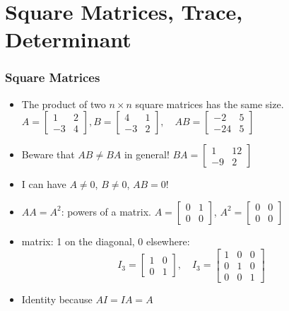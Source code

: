\documentclass[8pt]{beamer}
\newcommand{\myemph}[1]{{\color{blue}{#1}}}
\begin{document}
\section{Square Matrices, Trace, Determinant}



\begin{frame}
  \frametitle{Square Matrices}
  \begin{itemize}
  \item The product of two $n\times n$ square matrices has the same size.
    $A= 
    \begin{bmatrix}
      1 & 2\\ -3 & 4
    \end{bmatrix}, B = 
    \begin{bmatrix}
      4 & 1\\
      -3 & 2
    \end{bmatrix}, \quad
    A B= 
    \begin{bmatrix}
      -2 & 5\\ -24& 5
    \end{bmatrix}
    $
  \item Beware that $A B \not = B A$ in general! $B A =
    \begin{bmatrix}
      1 & 12\\ -9 & 2
    \end{bmatrix}
    $
  \item I can have $A\not= 0$, $B\not = 0$, $AB = 0$!
  \item $AA = A^2$: powers of a matrix. $A =
    \begin{bmatrix}
      0 & 1\\
      0 & 0
    \end{bmatrix} 
    $, $A^2 =
    \begin{bmatrix}
      0 & 0\\ 0 & 0
    \end{bmatrix}
    $
  \item \myemph{Identity} matrix: 1 on the diagonal, 0 elsewhere: 
    $$
    I_3 =
    \begin{bmatrix}
      1 & 0\\
      0 & 1
    \end{bmatrix},\quad
    I_3 =
    \begin{bmatrix}
      1 & 0 & 0\\
      0 & 1  & 0\\
      0 & 0 & 1
    \end{bmatrix}
    $$
  \item Identity because $A I = I A = A$

  \end{itemize}
\end{frame}
\end{document}

